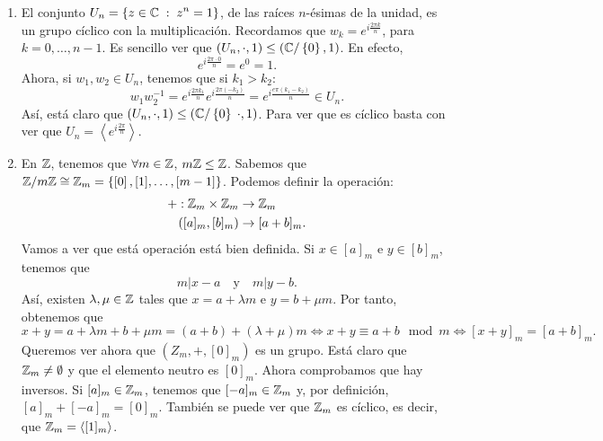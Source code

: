 \begin{eg}
\begin{enumerate}
	\item El conjunto $\displaystyle U_{n} = \left\{ z \in \mathbb{C} \; : \; z^{n} = 1\right\}  $, de las raíces $\displaystyle n $-ésimas de la unidad, es un grupo cíclico con la multiplicación. Recordamos que $\displaystyle w_{k} = e^{i\frac{2\pi k}{n}} $, para $\displaystyle k = 0, \ldots, n-1 $. Es sencillo ver que $\displaystyle \left(U_{n}, \cdot, 1\right) \leq \left(\mathbb{C} / \left\{ 0\right\} , 1\right) $. En efecto, 
		\[ e^{i\frac{2\pi \cdot 0}{n} } = e^{0} = 1 .\]
		Ahora, si $\displaystyle w_{1}, w_{2} \in U_{n} $, tenemos que si $\displaystyle k_{1} > k_{2} $:
		\[w_{1}w_{2}^{-1} = e^{i\frac{2\pi k_{1}}{n}}e^{i\frac{2\pi \left(-k_{2}\right)}{n}} = e^{i\frac{e\pi\left(k_{1}-k_{2}\right)}{n }}\in U_{n}.\]
		Así, está claro que $\displaystyle \left(U_{n}, \cdot , 1\right) \leq \left(\mathbb{C} / \left\{ 0\right\} \; \cdot , 1\right) $. Para ver que es cíclico basta con ver que $\displaystyle U_{n} = \left\langle e^{i\frac{2\pi }{n}} \right\rangle  $. 
	\item En $\displaystyle \mathbb{Z} $, tenemos que $\displaystyle \forall m \in \mathbb{Z} $, $\displaystyle m\mathbb{Z} \leq \mathbb{Z} $. Sabemos que $\displaystyle \mathbb{Z} / m\mathbb{Z} \cong \mathbb{Z}_{m} = \left\{ \left[0\right] , [1], \ldots, [m -1]\right\}  $. Podemos definir la operación:
	\[
	\begin{split}
		+ :	\mathbb{Z}_{m} \times \mathbb{Z}_{m} & \to \mathbb{Z}_{m} \\
		\left([a]_{m}, [b]_{m}\right) & \to [a + b]_{m}.
	\end{split}
	\]
	Vamos a ver que está operación está bien definida. Si $\displaystyle x \in [a]_{m} $ e $\displaystyle y \in [b]_{m} $, tenemos que 
	\[m | x - a \quad \text{y} \quad m | y - b .\]
	Así, existen $\displaystyle \lambda, \mu \in \mathbb{Z} $ tales que $\displaystyle x = a + \lambda m $ e $\displaystyle y = b + \mu m $. Por tanto, obtenemos que
	\[ x + y = a + \lambda m + b + \mu m = \left(a+b\right) + \left(\lambda + \mu\right)m \iff x + y \equiv a + b \mod m \iff [x +y]_{m} = [a + b]_{m} .\]
	Queremos ver ahora que $\displaystyle \left(Z_{m}, +, [0]_{m}\right) $ es un grupo. Está claro que $\displaystyle \mathbb{Z}_{m} \neq \emptyset $ y que el elemento neutro es $\displaystyle [0]_{m} $. Ahora comprobamos que hay inversos. Si $\displaystyle [a]_{m} \in \mathbb{Z}_{m} $, tenemos que $\displaystyle [-a]_{m} \in \mathbb{Z}_{m} $ y, por definición, $\displaystyle [a]_{m} + [-a]_{m} = [0]_{m} $. También se puede ver que $\displaystyle \mathbb{Z}_{m} $ es cíclico, es decir, que $\displaystyle \mathbb{Z}_{m} = \left\langle [1]_{m} \right\rangle  $.
\end{enumerate}
\end{eg}

